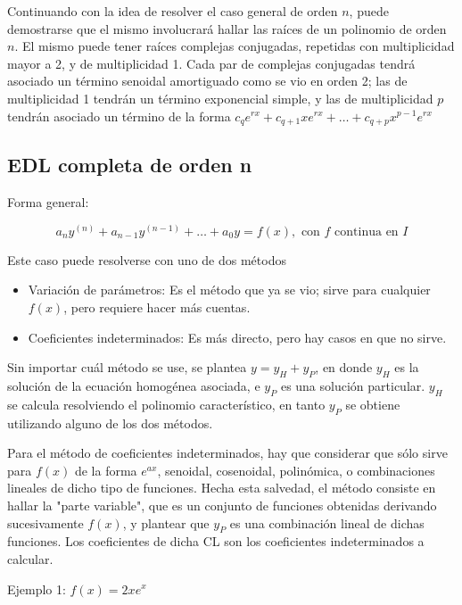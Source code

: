 \documentclass{article}
\begin{document}
Continuando con la idea de resolver el caso general de orden $n$, puede demostrarse que el mismo involucrará hallar las raíces de un polinomio de orden $n$. El mismo puede tener raíces complejas conjugadas, repetidas con multiplicidad mayor a 2, y de multiplicidad 1. Cada par de complejas conjugadas tendrá asociado un término senoidal amortiguado como se vio en orden 2; las de multiplicidad 1 tendrán un término exponencial simple, y las de multiplicidad $p$ tendrán asociado un término de la forma $c_{q}e^{r x} + c_{q+1} x e^{r x} + \ldots + c_{q+p} x^{p-1} e^{r x}$

\subsection{EDL completa de orden n}

Forma general:

\begin{equation}
a_n y^{(n)} + a_{n-1} y^{(n-1)} + \ldots + a_0 y = f(x), \text{ con } f \text{ continua en } I
\end{equation}

Este caso puede resolverse con uno de dos métodos

\begin{itemize}
\item Variación de parámetros: Es el método que ya se vio; sirve para cualquier $f(x)$, pero requiere hacer más cuentas.
\item Coeficientes indeterminados: Es más directo, pero hay casos en que no sirve.
\end{itemize}

Sin importar cuál método se use, se plantea $y = y_H + y_P$, en donde $y_H$ es la solución de la ecuación homogénea asociada, e $y_P$ es una solución particular. $y_H$ se calcula resolviendo el polinomio característico, en tanto $y_P$ se obtiene utilizando alguno de los dos métodos.

Para el método de coeficientes indeterminados, hay que considerar que sólo sirve para $f(x)$ de la forma $e^{a x}$, senoidal, cosenoidal, polinómica, o combinaciones lineales de dicho tipo de funciones. Hecha esta salvedad, el método consiste en hallar la "parte variable", que es un conjunto de funciones obtenidas derivando sucesivamente $f(x)$, y plantear que $y_P$ es una combinación lineal de dichas funciones. Los coeficientes de dicha CL son los coeficientes indeterminados a calcular.

Ejemplo 1: $f(x) = 2 x e^x$
\end{document}
